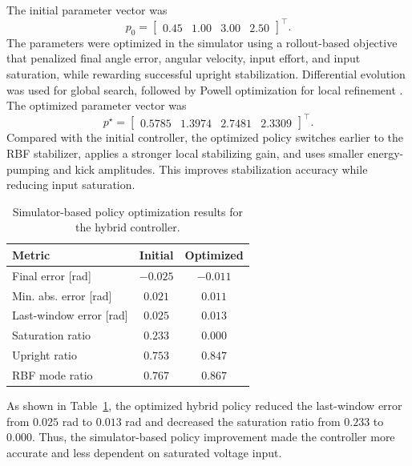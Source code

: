 The initial parameter vector was
\begin{equation}
    p_0 =
    \begin{bmatrix}
        0.45 & 1.00 & 3.00 & 2.50
    \end{bmatrix}^{\top}.
\label{eq:hybrid_initial_parameters}
\end{equation}
The parameters were optimized in the simulator using a rollout-based objective
that penalized final angle error, angular velocity, input effort, and input
saturation, while rewarding successful upright stabilization. Differential
evolution was used for global search, followed by Powell optimization for local
refinement \cite{storn1997differential,powell1964efficient}. The optimized parameter vector was
\begin{equation}
    p^{\star} =
    \begin{bmatrix}
        0.5785 & 1.3974 & 2.7481 & 2.3309
    \end{bmatrix}^{\top}.
\label{eq:hybrid_optimized_parameters}
\end{equation}
Compared with the initial controller, the optimized policy switches earlier to
the RBF stabilizer, applies a stronger local stabilizing gain, and uses smaller
energy-pumping and kick amplitudes. This improves stabilization accuracy while
reducing input saturation.

\begin{table}[htbp]
    \caption{Simulator-based policy optimization results for the hybrid
    controller.}
    \centering
    \begin{tabular}{lcc}
        \toprule
        Metric & Initial & Optimized \\
        \midrule
        Final error [rad] & $-0.025$ & $-0.011$ \\
        Min. abs. error [rad] & $0.021$ & $0.011$ \\
        Last-window error [rad] & $0.025$ & $0.013$ \\
        Saturation ratio & $0.233$ & $0.000$ \\
        Upright ratio & $0.753$ & $0.847$ \\
        RBF mode ratio & $0.767$ & $0.867$ \\
        \bottomrule
    \end{tabular}
    \label{tab:hybrid_optimization}
\end{table}

As shown in Table~\ref{tab:hybrid_optimization}, the optimized hybrid policy
reduced the last-window error from \(0.025\) rad to \(0.013\) rad and decreased
the saturation ratio from \(0.233\) to \(0.000\). Thus, the simulator-based
policy improvement made the controller more accurate and less dependent on
saturated voltage input.


